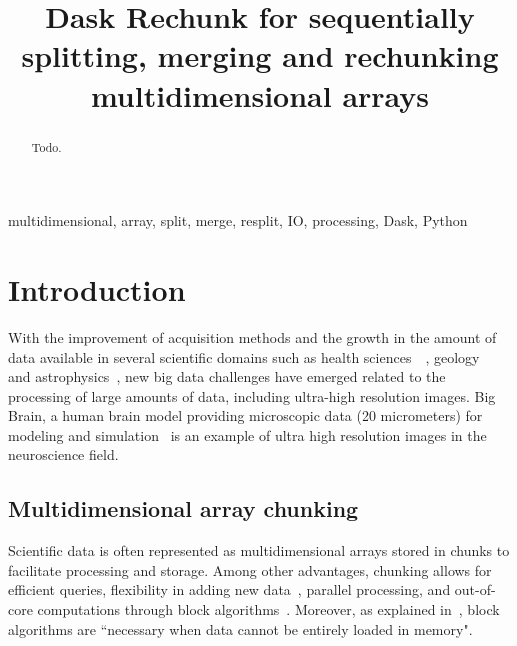 \documentclass[conference]{IEEEtran}
\begin{document}
\title{ Dask Rechunk for sequentially splitting, merging and rechunking multidimensional arrays }

\author{
}

\maketitle

\begin{abstract}
Todo.
\end{abstract}

\begin{IEEEkeywords}
multidimensional, array, split, merge, resplit, IO, processing, Dask, Python
\end{IEEEkeywords}

\section{Introduction}
With the improvement of acquisition methods and the growth in the amount of data
available in several scientific domains such as health
sciences~\cite{bigdata_health}~\cite{Amunts1472}, geology~\cite{big_data_geology}
and astrophysics~\cite{biguniverse}, new big data challenges have emerged related
to the processing of large amounts of data, including ultra-high resolution
images. Big Brain, a human brain model providing microscopic data (20 micrometers) for
modeling and simulation~\cite{Amunts1472} is an example of ultra high resolution
images in the neuroscience field.

\subsection{Multidimensional array chunking}
Scientific data is often represented as multidimensional arrays stored in
chunks to facilitate processing and storage. Among other advantages, chunking
allows for efficient queries, flexibility in adding new
data~\cite{optimal_chuking}, parallel processing, and out-of-core
computations through block algorithms~\cite{matthew_rocklin-proc-scipy-2015}.
Moreover, as explained in~\cite{matthew_rocklin-proc-scipy-2015}, block
algorithms are ``necessary when data cannot be entirely loaded in memory".
\end{document}
